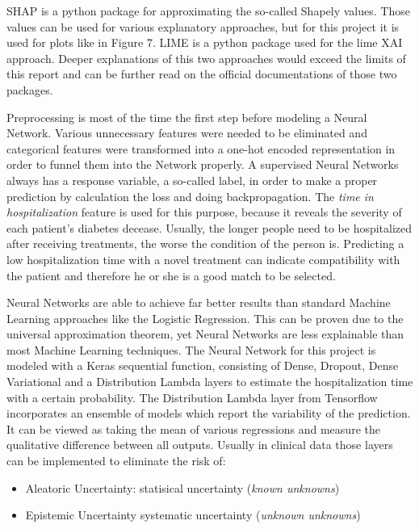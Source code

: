 \documentclass[journal]{IEEEtran}
\begin{document}
SHAP is a python package for approximating the so-called Shapely values. Those values can be used for various explanatory approaches, but for this project it is used for plots like in Figure 7. LIME is a python package used for the lime XAI approach. Deeper explanations of this two approaches would exceed the limits of this report and can be further read on the official documentations of those two packages.
	
Preprocessing is most of the time the first step before modeling a Neural Network. Various unnecessary features were needed to be eliminated and categorical features were transformed into a one-hot encoded representation in order to funnel them into the Network properly. A supervised Neural Networks always has a response variable, a so-called label, in order to make a proper prediction by calculation the loss and doing backpropagation. The \textit{time in hospitalization} feature is used for this purpose, because it reveals the severity of each patient's diabetes decease. Usually, the longer people need to be hospitalized after receiving treatments, the worse the condition of the person is. Predicting a low hospitalization time with a novel treatment can indicate compatibility with the patient and therefore he or she is a good match to be selected. 

Neural Networks are able to achieve far better results than standard Machine Learning approaches like the Logistic Regression. This can be proven due to the universal approximation theorem, yet Neural Networks are less explainable than most Machine Learning techniques. The Neural Network for this project is modeled with a Keras sequential function, consisting of Dense, Dropout, Dense Variational and a Distribution Lambda layers to estimate the hospitalization time with a certain probability. The Distribution Lambda layer from Tensorflow incorporates an ensemble of models which report the variability of the prediction. It can be viewed as taking the mean of various regressions and measure the qualitative difference between all outputs. Usually in clinical data those layers can be implemented to eliminate the risk of: \\

\begin{itemize}
	\item Aleatoric Uncertainty: statisical uncertainty (\textit{known unknowns})
	\item Epistemic Uncertainty systematic uncertainty (\textit{unknown unknowns})\\
\end{itemize}
\end{document}
